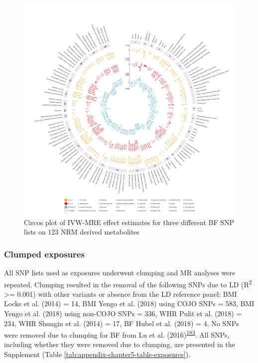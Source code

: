 \documentclass[11pt,twoside]{bristolthesis}
\begin{document}
\begin{figure}
\includegraphics[width=1\linewidth]{data/chapter5/figures/circosplot_additional_BF} \caption{Circos plot of IVW-MRE effect estimates for three different BF SNP lists on 123 NRM derived metabolites}\label{fig:chapter5-figure-circosplot-additional-BF}
\end{figure}
\hypertarget{clumped-exposures}{%
\subsubsection{Clumped exposures}\label{clumped-exposures}}

All SNP lists used as exposures underwent clumping and MR analyses were repeated. Clumping resulted in the removal of the following SNPs due to LD (R\textsuperscript{2} \textgreater{}= 0.001) with other variants or absence from the LD reference panel: BMI Locke et al. (2014) = 14, BMI Yengo et al. (2018) using COJO SNPs = 583, BMI Yengo et al. (2018) using non-COJO SNPs = 336, WHR Pulit et al. (2018) = 234, WHR Shungin et al. (2014) = 17, BF Hubel et al. (2018) = 4. No SNPs were removed due to clumping for BF from Lu et al. (2016)\textsuperscript{\protect\hyperlink{ref-Lu2016}{183}}. All SNPs, including whether they were removed due to clumping, are presented in the Supplement (Table \ref{tab:appendix-chapter5-table-exposures}).
\end{document}
